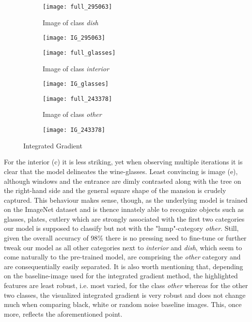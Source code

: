 \documentclass[11pt, oneside]{article}   	%
\begin{document}
\begin{figure}
\centering
\begin{subfigure}{.5\textwidth}
	\centering
	\texttt{[image: full\_295063]}
	\caption{Image of class \textit{dish}}
	\label{A subfigure label}
\end{subfigure}%
\begin{subfigure}{.5\textwidth}
	\centering
	\texttt{[image: IG\_295063]}
	\caption{}
	\label{A subfigure label}
\end{subfigure}
\begin{subfigure}{.5\textwidth}
	\centering
	\texttt{[image: full\_glasses]}
	\caption{Image of class \textit{interior}}
	\label{A subfigure label}
\end{subfigure}%
\begin{subfigure}{.5\textwidth}
	\centering
	\texttt{[image: IG\_glasses]}
	\caption{}
	\label{A subfigure label}
\end{subfigure}
\begin{subfigure}{.5\textwidth}
	\centering
	\texttt{[image: full\_243378]}
	\caption{Image of class \textit{other}}
	\label{A subfigure label}
\end{subfigure}%
\begin{subfigure}{.5\textwidth}
	\centering
	\texttt{[image: IG\_243378]}
	\caption{}
	\label{A subfigure label}
\end{subfigure}
\caption{Integrated Gradient}
\label{figure label}
\end{figure}
\newline 
For the interior (c) it is less striking, yet when observing multiple iterations it is clear that the model delineates the wine-glasses. \newline Least convincing is image (e), although windows and the entrance are dimly contrasted along with the tree on the right-hand side and the general square shape of the mansion is crudely captured.
\newline
\newline
This behaviour makes sense, though, as the underlying model is trained on the ImageNet dataset and is thence innately able to recognize objects such as glasses, plates, cutlery which are strongly associated with the first two categories our model is supposed to classify but not with the "lump"-category \textit{other}. Still, given the overall accuracy of 98\% there is no pressing need to fine-tune or further tweak our model as all other categories next to \textit{interior} and \textit{dish}, which seem to come naturally to the pre-trained model, are comprising the \textit{other} category and are consequentially easily separated.
\newline
It is also worth mentioning that, depending on the baseline-image used for the integrated gradient method, the highlighted features are least robust, i.e. most varied, for the class \textit{other} whereas for the other two classes, the visualized integrated gradient is very robust and does not change much when comparing black, white or random noise baseline images. This, once more, reflects the aforementioned point.
\end{document}
